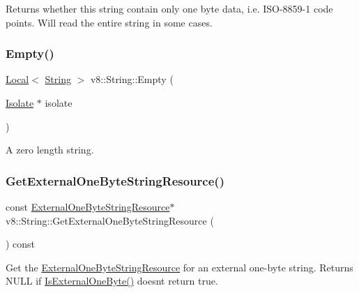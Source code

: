 Returns whether this string contain only one byte data, i.\+e. I\+S\+O-\/8859-\/1 code points. Will read the entire string in some cases. \mbox{\label{classv8_1_1String_aa393d47baa54467fe57001065e49194b}} 
\subsubsection{\texorpdfstring{Empty()}{Empty()}}
{\footnotesize\ttfamily \mbox{\hyperlink{classv8_1_1Local}{Local}}$<$ \mbox{\hyperlink{classv8_1_1String}{String}} $>$ v8\+::\+String\+::\+Empty (\begin{DoxyParamCaption}\item[{\mbox{\hyperlink{classv8_1_1Isolate}{Isolate}} $\ast$}]{isolate }\end{DoxyParamCaption})\hspace{0.3cm}{\ttfamily [static]}}

A zero length string. \mbox{\label{classv8_1_1String_af93d92ca10a216be472d1b7c20550f76}} 
\subsubsection{\texorpdfstring{Get\+External\+One\+Byte\+String\+Resource()}{GetExternalOneByteStringResource()}}
{\footnotesize\ttfamily const \mbox{\hyperlink{classv8_1_1String_1_1ExternalOneByteStringResource}{External\+One\+Byte\+String\+Resource}}$\ast$ v8\+::\+String\+::\+Get\+External\+One\+Byte\+String\+Resource (\begin{DoxyParamCaption}{ }\end{DoxyParamCaption}) const}

Get the \mbox{\hyperlink{classv8_1_1String_1_1ExternalOneByteStringResource}{External\+One\+Byte\+String\+Resource}} for an external one-\/byte string. Returns N\+U\+LL if \mbox{\hyperlink{classv8_1_1String_a29b5d1786d906b84e10a5cab9451f976}{Is\+External\+One\+Byte()}} doesn\textquotesingle{}t return true. \mbox{\label{classv8_1_1String_ac751c8c239eb213a879204cab6787883}} 
